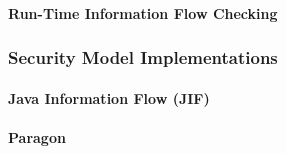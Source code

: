 	\paragraph{Run-Time Information Flow Checking}
	
	\cite{austin2009dynamicif}
	
\subsubsection{Security Model Implementations}

	\paragraph{Java Information Flow (JIF)}
	
	\cite{pullicino2014jif}
	
	\cite{broberg2013paragon}
	
	\paragraph{Paragon}